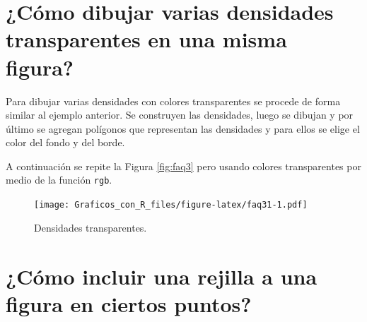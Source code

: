 \documentclass[10pt,]{krantz}
\makeatletter
\newenvironment{Shaded}{\begin{snugshade}}{\end{snugshade}}
\newcommand{\KeywordTok}[1]{\textcolor[rgb]{0.13,0.29,0.53}{\textbf{#1}}}
\newcommand{\DataTypeTok}[1]{\textcolor[rgb]{0.13,0.29,0.53}{#1}}
\newcommand{\DecValTok}[1]{\textcolor[rgb]{0.00,0.00,0.81}{#1}}
\newcommand{\FloatTok}[1]{\textcolor[rgb]{0.00,0.00,0.81}{#1}}
\newcommand{\StringTok}[1]{\textcolor[rgb]{0.31,0.60,0.02}{#1}}
\newcommand{\OperatorTok}[1]{\textcolor[rgb]{0.81,0.36,0.00}{\textbf{#1}}}
\newcommand{\NormalTok}[1]{#1}
\newenvironment{kframe}{%
\medskip{}
\setlength{\fboxsep}{.8em}
 \def\at@end@of@kframe{}%
 \ifinner\ifhmode%
  \def\at@end@of@kframe{\end{minipage}}%
  \begin{minipage}{\columnwidth}%
 \fi\fi%
 \def\FrameCommand##1{\hskip\@totalleftmargin \hskip-\fboxsep
 \colorbox{shadecolor}{##1}\hskip-\fboxsep
     \hskip-\linewidth \hskip-\@totalleftmargin \hskip\columnwidth}%
 \MakeFramed {\advance\hsize-\width
   \@totalleftmargin\z@ \linewidth\hsize
   \@setminipage}}%
 {\par\unskip\endMakeFramed%
 \at@end@of@kframe}
\renewenvironment{Shaded}{\begin{kframe}}{\end{kframe}}
\makeatother
\begin{document}
\section{¿Cómo dibujar varias densidades transparentes en una misma
figura?}\label{como-dibujar-varias-densidades-transparentes-en-una-misma-figura}

Para dibujar varias densidades con colores transparentes se procede de
forma similar al ejemplo anterior. Se construyen las densidades, luego
se dibujan y por último se agregan polígonos que representan las
densidades y para ellos se elige el color del fondo y del borde.

A continuación se repite la Figura \ref{fig:faq3} pero usando colores
transparentes por medio de la función \texttt{rgb}.

\begin{Shaded}
\end{Shaded}

\begin{figure}
\centering
\texttt{[image: Graficos\_con\_R\_files/figure-latex/faq31-1.pdf]}
\caption{\label{fig:faq31}Densidades transparentes.}
\end{figure}

\section{\texorpdfstring{¿Cómo incluir una rejilla a una figura en
ciertos puntos?
\label{rejper}}{¿Cómo incluir una rejilla a una figura en ciertos puntos? }}\label{como-incluir-una-rejilla-a-una-figura-en-ciertos-puntos}
\end{document}
